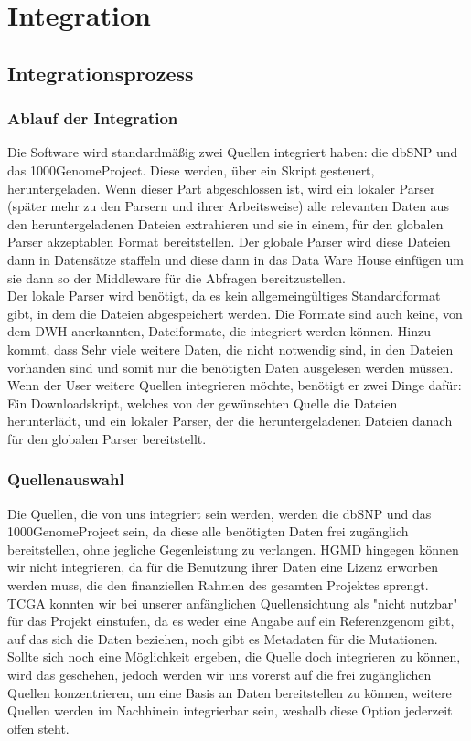 \section{Integration}
\subsection{Integrationsprozess}
\subsubsection{Ablauf der Integration}
Die Software wird standardmäßig zwei Quellen integriert haben: die dbSNP und das 1000GenomeProject. Diese werden, über ein Skript gesteuert, heruntergeladen. Wenn dieser Part abgeschlossen ist, wird ein lokaler Parser (später mehr zu den Parsern und ihrer Arbeitsweise) alle relevanten Daten aus den heruntergeladenen Dateien extrahieren und sie in einem, für den globalen Parser akzeptablen Format bereitstellen. Der globale Parser wird diese Dateien dann in Datensätze staffeln und diese dann in das Data Ware House einfügen um sie dann so der Middleware für die Abfragen bereitzustellen.\\
Der lokale Parser wird benötigt, da es kein allgemeingültiges Standardformat gibt, in dem die Dateien abgespeichert werden. Die Formate sind auch keine, von dem DWH anerkannten, Dateiformate, die integriert werden können. Hinzu kommt, dass Sehr viele weitere Daten, die nicht notwendig sind, in den Dateien vorhanden sind und somit nur die benötigten Daten ausgelesen werden müssen.\\
Wenn der User weitere Quellen integrieren möchte, benötigt er zwei Dinge dafür: Ein Downloadskript, welches von der gewünschten Quelle die Dateien herunterlädt, und ein lokaler Parser, der die heruntergeladenen Dateien danach für den globalen Parser bereitstellt.
\subsubsection{Quellenauswahl}
Die Quellen, die von uns integriert sein werden, werden die dbSNP und das 1000GenomeProject sein, da diese alle benötigten Daten frei zugänglich bereitstellen, ohne jegliche Gegenleistung zu verlangen. HGMD hingegen können wir nicht integrieren, da für die Benutzung ihrer Daten eine Lizenz erworben werden muss, die den finanziellen Rahmen des gesamten Projektes sprengt. TCGA konnten wir bei unserer anfänglichen Quellensichtung als "nicht nutzbar" für das Projekt einstufen, da es weder eine Angabe auf ein Referenzgenom gibt, auf das sich die Daten beziehen, noch gibt es Metadaten für die Mutationen. Sollte sich noch eine Möglichkeit ergeben, die Quelle doch integrieren zu können, wird das geschehen, jedoch werden wir uns vorerst auf die frei zugänglichen Quellen konzentrieren, um eine Basis an Daten bereitstellen zu können, weitere Quellen werden im Nachhinein integrierbar sein, weshalb diese Option jederzeit offen steht.
